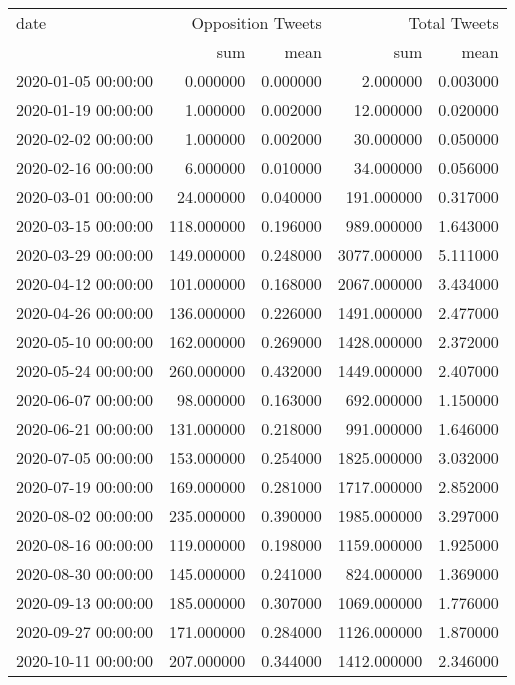 \begin{tabular}{lrrrr}
\toprule
date & \multicolumn{2}{r}{Opposition Tweets} & \multicolumn{2}{r}{Total Tweets} \\
 & sum & mean & sum & mean \\
\midrule
2020-01-05 00:00:00 & 0.000000 & 0.000000 & 2.000000 & 0.003000 \\
2020-01-19 00:00:00 & 1.000000 & 0.002000 & 12.000000 & 0.020000 \\
2020-02-02 00:00:00 & 1.000000 & 0.002000 & 30.000000 & 0.050000 \\
2020-02-16 00:00:00 & 6.000000 & 0.010000 & 34.000000 & 0.056000 \\
2020-03-01 00:00:00 & 24.000000 & 0.040000 & 191.000000 & 0.317000 \\
2020-03-15 00:00:00 & 118.000000 & 0.196000 & 989.000000 & 1.643000 \\
2020-03-29 00:00:00 & 149.000000 & 0.248000 & 3077.000000 & 5.111000 \\
2020-04-12 00:00:00 & 101.000000 & 0.168000 & 2067.000000 & 3.434000 \\
2020-04-26 00:00:00 & 136.000000 & 0.226000 & 1491.000000 & 2.477000 \\
2020-05-10 00:00:00 & 162.000000 & 0.269000 & 1428.000000 & 2.372000 \\
2020-05-24 00:00:00 & 260.000000 & 0.432000 & 1449.000000 & 2.407000 \\
2020-06-07 00:00:00 & 98.000000 & 0.163000 & 692.000000 & 1.150000 \\
2020-06-21 00:00:00 & 131.000000 & 0.218000 & 991.000000 & 1.646000 \\
2020-07-05 00:00:00 & 153.000000 & 0.254000 & 1825.000000 & 3.032000 \\
2020-07-19 00:00:00 & 169.000000 & 0.281000 & 1717.000000 & 2.852000 \\
2020-08-02 00:00:00 & 235.000000 & 0.390000 & 1985.000000 & 3.297000 \\
2020-08-16 00:00:00 & 119.000000 & 0.198000 & 1159.000000 & 1.925000 \\
2020-08-30 00:00:00 & 145.000000 & 0.241000 & 824.000000 & 1.369000 \\
2020-09-13 00:00:00 & 185.000000 & 0.307000 & 1069.000000 & 1.776000 \\
2020-09-27 00:00:00 & 171.000000 & 0.284000 & 1126.000000 & 1.870000 \\
2020-10-11 00:00:00 & 207.000000 & 0.344000 & 1412.000000 & 2.346000 \\

\end{tabular}
